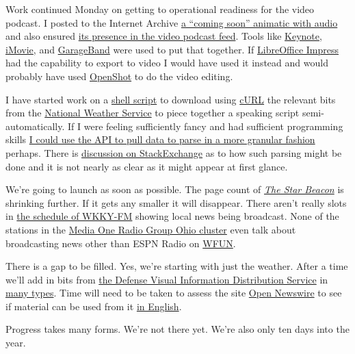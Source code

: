Work continued Monday on getting to operational readiness for the video
podcast. I posted to the Internet Archive
\href{https://archive.org/details/coming-soon-to-elp-tv}{a ``coming
soon'' animatic with audio} and also ensured
\href{https://coyote.works/2023/coming-soon.html}{its presence in the
video podcast feed}. Tools like
\href{https://en.wikipedia.org/wiki/Keynote_(presentation_software)}{Keynote},
\href{https://en.wikipedia.org/wiki/IMovie}{iMovie}, and
\href{https://en.wikipedia.org/wiki/GarageBand}{GarageBand} were used to
put that together. If
\href{https://en.wikipedia.org/wiki/LibreOffice_Impress}{LibreOffice
Impress} had the capability to export to video I would have used it
instead and would probably have used
\href{https://en.wikipedia.org/wiki/OpenShot}{OpenShot} to do the video
editing.

I have started work on a
\href{https://code.launchpad.net/~skellat/+git/show-prep-scripts}{shell
script} to download using \href{https://curl.se/}{cURL} the relevant
bits from the
\href{https://en.wikipedia.org/wiki/National_Weather_Service}{National
Weather Service} to piece together a speaking script semi-automatically.
If I were feeling sufficiently fancy and had sufficient programming
skills \href{https://www.weather.gov/documentation/services-web-api}{I
could use the API to pull data to parse in a more granular fashion}
perhaps. There is
\href{https://web.archive.org/web/20220529113240/https://opendata.stackexchange.com/questions/297/how-does-one-parse-weather-data}{discussion
on StackExchange} as to how such parsing might be done and it is not
nearly as clear as it might appear at first glance.

We're going to launch as soon as possible. The page count of
\href{https://www.starbeacon.com/news/local_news/}{\emph{The Star
Beacon}} is shrinking further. If it gets any smaller it will disappear.
There aren't really slots in
\href{https://web.archive.org/web/20230110060246/https://wkky.com/program-schedule/}{the
schedule of WKKY-FM} showing local news being broadcast. None of the
stations in the \href{http://mediaoneradiogroup.com/}{Media One Radio
Group Ohio cluster} even talk about broadcasting news other than ESPN
Radio on \href{https://en.wikipedia.org/wiki/WFUN_(AM)}{WFUN}.

There is a gap to be filled. Yes, we're starting with just the weather.
After a time we'll add in bits from
\href{https://www.dvidshub.net/search/?q=&filter\%5Btype\%5D=video&filter\%5Bcategory\%5D=Newscasts&view=grid&sort=publishdate}{the
Defense Visual Information Distribution Service} in
\href{https://www.dvidshub.net/search/?q=&filter\%5Btype\%5D=video&view=grid&sort=publishdate}{many
types}. Time will need to be taken to assess the site
\href{https://www.opennewswire.org/}{Open Newswire} to see if material
can be used from it \href{https://opennewswire.org/feed/?language=1}{in
English}.

Progress takes many forms. We're not there yet. We're also only ten days
into the year.
